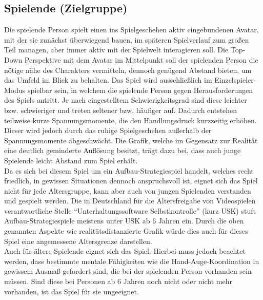 \documentclass[paper=A4,pagesize=auto,12pt,headinclude=true,footinclude=true,BCOR=0mm,DIV=calc]{scrartcl}
\newcommand{\sectionspace}{
	\vspace{0.5cm}
}
\begin{document}
\subsection{Spielende (Zielgruppe)}\label{sec:Spieler}
Die spielende Person spielt einen ins Spielgeschehen aktiv eingebundenen Avatar, mit der sie zunächst überwiegend bauen, im späteren Spielverlauf zum großen Teil managen, aber immer aktiv mit der Spielwelt interagieren soll. Die Top-Down Perspektive mit dem Avatar im Mittelpunkt soll der spielenden Person die nötige nähe des Charakters vermitteln, dennoch genügend Abstand bieten, um das Umfeld im Blick zu behalten. Das Spiel wird ausschließlich im Einzelspieler-Modus spielbar sein, in welchem die spielende Person gegen Herausforderungen des Spiels antritt. Je nach eingestelltem Schwierigkeitsgrad sind diese leichter bzw. schwieriger und treten seltener bzw. häufiger auf. Dadurch entstehen teilweise kurze Spannungsmomente, die den Handlungsdruck kurzzeitig erhöhen. Dieser wird jedoch durch das ruhige Spielgeschehen außerhalb der Spannungsmomente abgeschwächt. Die Grafik, welche im Gegensatz zur Realität eine deutlich geminderte Auflösung besitzt, trägt dazu bei, dass auch junge Spielende leicht Abstand zum Spiel erhält.\\
Da es sich bei diesem Spiel um ein Aufbau-Strategiespiel handelt, welches recht friedlich, in gewissen Situationen dennoch anspruchsvoll ist, eignet sich das Spiel nicht für jede Altersgruppe, kann aber auch von jungen Spielenden verstanden und gespielt werden. Die in Deutschland für die Altersfreigabe von Videospielen verantwortliche Stelle "`Unterhaltungssoftware Selbstkontrolle"' (kurz USK) stuft Aufbau-Strategiespiele meistens unter USK ab 6 Jahren \cite{usk_6} ein. Durch die oben genannten Aspekte wie realitätsdistanzierte Grafik würde dies auch für dieses Spiel eine angemessene Altersgrenze darstellen. \\ 
Auch für ältere Spielende eignet sich das Spiel. Hierbei muss jedoch beachtet werden, dass bestimmte mentale Fähigkeiten wie die Hand-Auge-Koordination in gewissem Ausmaß gefordert sind, die bei der spielenden Person vorhanden sein müssen. Sind diese bei Personen ab 6 Jahren noch nicht oder nicht mehr vorhanden, ist das Spiel für sie ungeeignet.

\sectionspace
\end{document}
